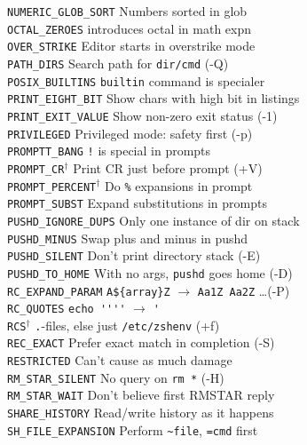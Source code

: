 \documentclass{article}
\newcommand\T[1]{\texttt{#1}}
\newcommand\D{$^\dag$}
\begin{document}
\begin{multicols}{3}
\begin{tabbing}
\T{NUMERIC\_GLOB\_SORT}  \>\> Numbers sorted in glob \\
\T{OCTAL\_ZEROES}        \> introduces octal in math expn \\
\T{OVER\_STRIKE}         \>\> Editor starts in overstrike mode \\
\T{PATH\_DIRS}           \>\> Search path for \verb!dir/cmd! (-Q) \\
\T{POSIX\_BUILTINS}      \>\> \T{builtin} command is specialer \\
\T{PRINT\_EIGHT\_BIT}    \>\> Show chars with high bit in listings \\
\T{PRINT\_EXIT\_VALUE}   \>\> Show non-zero exit status (-1) \\
\T{PRIVILEGED}           \>\> Privileged mode: safety first (-p) \\
\T{PROMPTT\_BANG}        \>\> \verb.!. is special in prompts \\
\T{PROMPT\_CR}\D         \>\> Print CR just before prompt (+V) \\
\T{PROMPT\_PERCENT}\D    \>\> Do \verb!%! expansions in prompt \\
\T{PROMPT\_SUBST}        \>\> Expand substitutions in prompts \\
\T{PUSHD\_IGNORE\_DUPS}  \>\> Only one instance of dir on stack \\
\T{PUSHD\_MINUS}         \>\> Swap plus and minus in pushd \\
\T{PUSHD\_SILENT}        \>\> Don't print directory stack (-E) \\
\T{PUSHD\_TO\_HOME}      \>\> With no args, \T{pushd} goes home (-D) \\
\T{RC\_EXPAND\_PARAM}    \>\> \verb!A${array}Z!  $\to$ \verb!Aa1Z Aa2Z!
   \dots (-P) \\
\T{RC\_QUOTES}           \>\> \verb!echo ''''! $\to$ \verb!'! \\
\T{RCS}\D                \>\> \verb!.!-files, else just
   \verb!/etc/zshenv! (+f) \\
\T{REC\_EXACT}           \>\> Prefer exact match in completion (-S) \\
\T{RESTRICTED}           \>\> Can't cause as much damage \\
\T{RM\_STAR\_SILENT}     \>\> No query on \verb!rm *! (-H) \\
\T{RM\_STAR\_WAIT}       \>\> Don't believe first RMSTAR reply \\
\T{SHARE\_HISTORY}       \>\> Read/write history as it happens \\
\T{SH\_FILE\_EXPANSION}  \>\> Perform \verb!~file!, \verb!=cmd! first \\

\end{tabbing}
\end{multicols}
\end{document}
